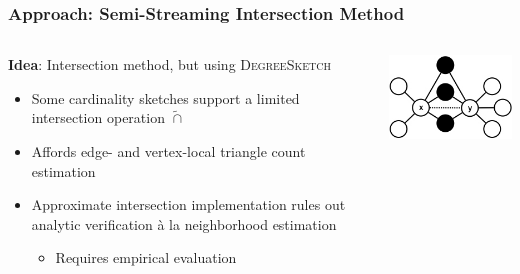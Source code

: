 \documentclass{beamer}
\newcommand{\algoname}[1]{\textnormal{\textsc{#1}}}
\begin{document}
\begin{frame}
\frametitle{Approach: Semi-Streaming Intersection Method}


\begin{columns}
\begin{column}{0.65\textwidth}
	\textbf{Idea}: Intersection method, but using \algoname{DegreeSketch}
	\begin{itemize}
		\item Some cardinality sketches support a limited intersection operation $\widetilde{\cap}$
		\item Affords edge- and vertex-local triangle count estimation
		\item Approximate intersection implementation rules out analytic verification \`a la neighborhood estimation
		\begin{itemize}
			\item Requires empirical evaluation		
		\end{itemize}
	\end{itemize}
\end{column}
\begin{column}{0.35\textwidth}  %
	\begin{center}
		\includegraphics[width=1.0\textwidth]{edge_local}

\end{center}
\end{column}
\end{columns}
\end{frame}
\end{document}
